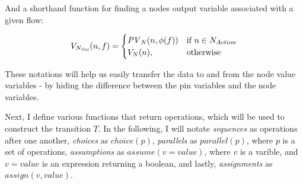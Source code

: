 And a shorthand function for finding a nodes output variable associated with a given flow:

\begin{equation*}
	V_{N_\mathit{Out}}(n, f) = 
	\begin{cases}
		\mathit{PV}_N(n, \phi(f)) & \text{if } n \in N_{Action} \\
		V_N(n), & \text{otherwise}
	\end{cases}
\end{equation*}

These notations will help us easily transfer the data to and from the node value variables - by hiding the difference between the pin variables and the node variables.

\newcommand{\enabled}{\mathit{En}}

Next, I define various functions that return operations, which will be used to construct the transition \(T\). In the following, I will notate \emph{sequences} as operations after one another, \emph{choices} as \(\mathit{choice}(p)\), \emph{parallels} as \(\mathit{parallel}(p)\), where \(p\) is a set of operations, \emph{assumptions} as \(\mathit{assume}(v = value)\), where \(v\) is a varible, and \(v = value\) is an expression returning a boolean, and lastly, \emph{assignments} as \(\mathit{assign}(v, value)\).

